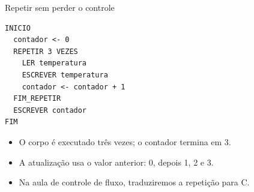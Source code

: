 \begin{frame}[fragile,t]{Repetir sem perder o controle}
\begin{lstlisting}[language={}]
INICIO
  contador <- 0
  REPETIR 3 VEZES
    LER temperatura
    ESCREVER temperatura
    contador <- contador + 1
  FIM_REPETIR
  ESCREVER contador
FIM
\end{lstlisting}
\begin{itemize}
\item O corpo é executado três vezes; o contador termina em 3.
\item A atualização usa o valor anterior: 0, depois 1, 2 e 3.
\item Na aula de controle de fluxo, traduziremos a repetição para C.
\end{itemize}
\end{frame}
